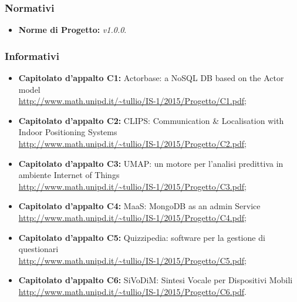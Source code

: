 \subsubsection{Normativi}
\begin{itemize}
\item \textbf{Norme di Progetto:} \textit{\NdP v1.0.0}.
\end{itemize}

\subsubsection{Informativi}
\begin{itemize}
\item \textbf{Capitolato d'appalto C1:} Actorbase: a NoSQL DB based on the Actor model
\\\url{http://www.math.unipd.it/~tullio/IS-1/2015/Progetto/C1.pdf};
\item \textbf{Capitolato d'appalto C2:} CLIPS: Communication \& Localisation with Indoor Positioning Systems
\\\url{http://www.math.unipd.it/~tullio/IS-1/2015/Progetto/C2.pdf}; 
\item \textbf{Capitolato d'appalto C3:} UMAP: un motore per l'analisi predittiva in ambiente Internet of Things 
\\\url{http://www.math.unipd.it/~tullio/IS-1/2015/Progetto/C3.pdf}; 
\item \textbf{Capitolato d'appalto C4:} MaaS: MongoDB as an admin Service
\\\url{http://www.math.unipd.it/~tullio/IS-1/2015/Progetto/C4.pdf}; 
\item \textbf{Capitolato d'appalto C5:} Quizzipedia: software per la gestione di questionari
\\\url{http://www.math.unipd.it/~tullio/IS-1/2015/Progetto/C5.pdf}; 
\item \textbf{Capitolato d'appalto C6:} SiVoDiM: Sintesi Vocale per Dispositivi Mobili 
\\\url{http://www.math.unipd.it/~tullio/IS-1/2015/Progetto/C6.pdf}.
\end{itemize}
